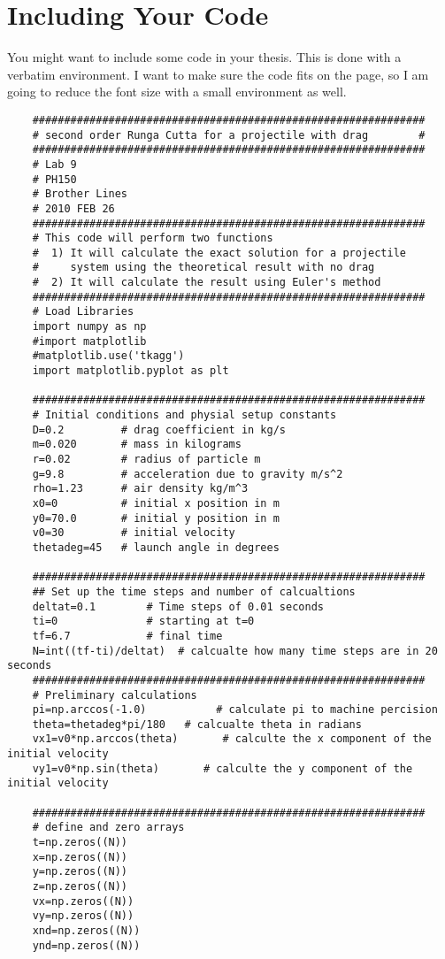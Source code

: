\chapter{Including Your Code}
\label{app:Talk}

You might want to include some code in your thesis. This is done with a verbatim environment. I want to make sure the code fits on the page, so I am going to reduce the font size with a small environment as well. 
\begin{small}
	\begin{verbatim}
	##############################################################
	# second order Runga Cutta for a projectile with drag        #
	##############################################################
	# Lab 9
	# PH150
	# Brother Lines
	# 2010 FEB 26
	##############################################################
	# This code will perform two functions
	#  1) It will calculate the exact solution for a projectile
	#     system using the theoretical result with no drag
	#  2) It will calculate the result using Euler's method
	##############################################################
	# Load Libraries
	import numpy as np
	#import matplotlib
	#matplotlib.use('tkagg')
	import matplotlib.pyplot as plt
	
	##############################################################
	# Initial conditions and physial setup constants
	D=0.2         # drag coefficient in kg/s
	m=0.020       # mass in kilograms
	r=0.02        # radius of particle m
	g=9.8         # acceleration due to gravity m/s^2
	rho=1.23      # air density kg/m^3
	x0=0          # initial x position in m
	y0=70.0       # initial y position in m
	v0=30         # initial velocity
	thetadeg=45   # launch angle in degrees
	
	##############################################################
	## Set up the time steps and number of calcualtions
	deltat=0.1        # Time steps of 0.01 seconds
	ti=0              # starting at t=0
	tf=6.7            # final time
	N=int((tf-ti)/deltat)  # calcualte how many time steps are in 20 seconds
	##############################################################
	# Preliminary calculations
	pi=np.arccos(-1.0)           # calculate pi to machine percision
	theta=thetadeg*pi/180   # calcualte theta in radians
	vx1=v0*np.arccos(theta)       # calculte the x component of the initial velocity
	vy1=v0*np.sin(theta)       # calculte the y component of the initial velocity
	
	##############################################################
	# define and zero arrays
	t=np.zeros((N))
	x=np.zeros((N))
	y=np.zeros((N))
	z=np.zeros((N))
	vx=np.zeros((N))
	vy=np.zeros((N))
	xnd=np.zeros((N))
	ynd=np.zeros((N))
	

\end{verbatim}
\end{small}
